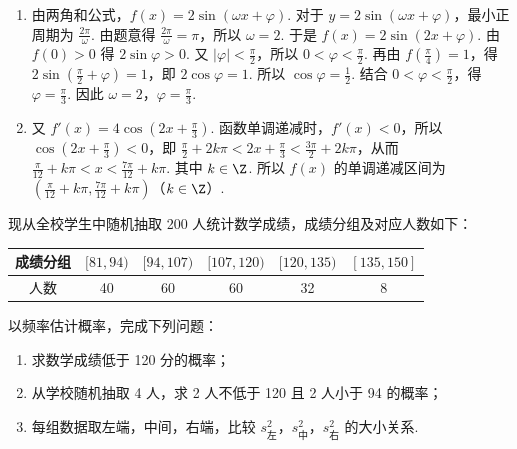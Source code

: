 \begin{solution}
\begin{enumerate}
\item 由两角和公式，\( f(x)=2\sin\left( \omega x+\varphi \right) \). 对于 \( y=2\sin\left( \omega x+\varphi \right) \)，最小正周期为 \( \frac{2\pi}{\omega} \). 由题意得 \( \frac{2\pi}{\omega}=\pi \)，所以 \( \omega=2 \). 于是 \( f(x)=2\sin\left( 2x+\varphi \right) \). 由 \( f(0)>0 \) 得 \( 2\sin \varphi>0 \). 又 \( \left| \varphi \right|<\frac{\pi}{2} \)，所以 \( 0<\varphi<\frac{\pi}{2} \). 再由 \( f\left( \frac{\pi}{4} \right)=1 \)，得 \( 2\sin\left( \frac{\pi}{2}+\varphi \right)=1 \)，即 \( 2\cos \varphi=1 \). 所以 \( \cos \varphi=\frac{1}{2} \). 结合 \( 0<\varphi<\frac{\pi}{2} \)，得 \( \varphi=\frac{\pi}{3} \). 因此 \( \omega=2 \)，\( \varphi=\frac{\pi}{3} \).
\item 又 \( f'(x)=4\cos\left( 2x+\frac{\pi}{3} \right) \). 函数单调递减时，\( f'(x)<0 \)，所以 \( \cos\left( 2x+\frac{\pi}{3} \right)<0 \)，即 \( \frac{\pi}{2}+2k\pi<2x+\frac{\pi}{3}<\frac{3\pi}{2}+2k\pi \)，从而 \( \frac{\pi}{12}+k\pi<x<\frac{7\pi}{12}+k\pi \).
其中 \( k\in\Z \). 所以 \( f(x) \) 的单调递减区间为 \( \left( \frac{\pi}{12}+k\pi,\frac{7\pi}{12}+k\pi \right) \)（\( k\in\Z \)）.
\end{enumerate}
\end{solution}

\begin{problem}
现从全校学生中随机抽取 200 人统计数学成绩，成绩分组及对应人数如下：

\begin{center}
\renewcommand{\arraystretch}{1.35}
\begin{tabular}{|c|c|c|c|c|c|}
\hline
成绩分组 & {\([81,94)\)} & {\([94,107)\)} & {\([107,120)\)} & {\([120,135)\)} & {\([135,150]\)} \\
\hline
人数 & 40 & 60 & 60 & 32 & 8 \\
\hline
\end{tabular}
\end{center}

以频率估计概率，完成下列问题：

\begin{enumerate}
\item 求数学成绩低于 120 分的概率；
\item 从学校随机抽取 4 人，求 2 人不低于 120 且 2 人小于 94 的概率；
\item 每组数据取左端，中间，右端，比较 \( s_{\text{左}}^2 \)，\( s_{\text{中}}^2 \)，\( s_{\text{右}}^2 \) 的大小关系.
\end{enumerate}
\end{problem}

